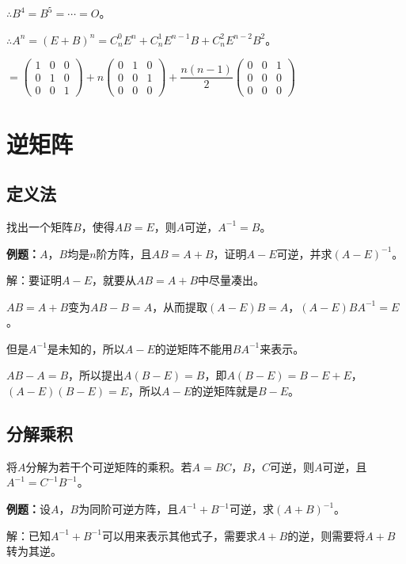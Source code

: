 \documentclass[UTF8, 12pt]{ctexart}
\begin{document}
$\therefore B^4=B^5=\cdots=O$。

$\therefore A^n=(E+B)^n=C_n^0E^n+C_n^1E^{n-1}B+C_n^2E^{n-2}B^2$。\medskip

$=\left(\begin{array}{ccc}
    1 & 0 & 0 \\
    0 & 1 & 0 \\
    0 & 0 & 1
\end{array}\right)+n\left(\begin{array}{ccc}
    0 & 1 & 0 \\
    0 & 0 & 1 \\
    0 & 0 & 0
\end{array}\right)+\dfrac{n(n-1)}{2}\left(\begin{array}{ccc}
    0 & 0 & 1 \\
    0 & 0 & 0 \\
    0 & 0 & 0
\end{array}\right)$

\section{逆矩阵}

\subsection{定义法}

找出一个矩阵$B$，使得$AB=E$，则$A$可逆，$A^{-1}=B$。

\textbf{例题：}$A$，$B$均是$n$阶方阵，且$AB=A+B$，证明$A-E$可逆，并求$(A-E)^{-1}$。

解：要证明$A-E$，就要从$AB=A+B$中尽量凑出。

$AB=A+B$变为$AB-B=A$，从而提取$(A-E)B=A$，$(A-E)BA^{-1}=E$。

但是$A^{-1}$是未知的，所以$A-E$的逆矩阵不能用$BA^{-1}$来表示。

$AB-A=B$，所以提出$A(B-E)=B$，即$A(B-E)=B-E+E$，$(A-E)(B-E)=E$，所以$A-E$的逆矩阵就是$B-E$。

\subsection{分解乘积}

将$A$分解为若干个可逆矩阵的乘积。若$A=BC$，$B$，$C$可逆，则$A$可逆，且$A^{-1}=C^{-1}B^{-1}$。

\textbf{例题：}设$A$，$B$为同阶可逆方阵，且$A^{-1}+B^{-1}$可逆，求$(A+B)^{-1}$。

解：已知$A^{-1}+B^{-1}$可以用来表示其他式子，需要求$A+B$的逆，则需要将$A+B$转为其逆。
\end{document}
